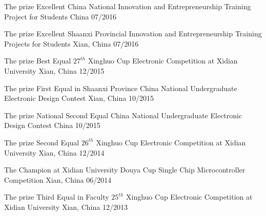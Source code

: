 


\begin{cvhonors}

  \cvhonor
    {The prize Excellent} %
    {China National Innovation and Entrepreneurship Training Project for Students} %
    {China} %
    {07/2016} %

  \cvhonor
    {The prize Excellent} %
    {Shaanxi Provincial Innovation and Entrepreneurship Training Projects for Students} %
    {Xian, China} %
    {07/2016} %

  \cvhonor
    {The prize Best Equal} %
    {$27^{th}$ Xinghuo Cup Electronic Competition at Xidian University} %
    {Xian, China} %
    {12/2015} %

  \cvhonor
	{The prize First Equal in Shaanxi Province} %
	{China National Undergraduate Electronic Design Contest} %
	{Xian, China} %
	{10/2015} %

  \cvhonor
	{The prize National Second Equal} %
	{China National Undergraduate Electronic Design Contest} %
	{China} %
	{10/2015} %

  \cvhonor
	{The prize Second Equal } %
	{$26^{th}$ Xinghuo Cup Electronic Competition at Xidian University} %
	{Xian, China} %
	{12/2014} %

  \cvhonor
	{The Champion at Xidian University} %
	{Douya Cup Single Chip Microcontroller Competition} %
	{Xian, China} %
	{06/2014} %

  \cvhonor
	{The prize Third Equal in Faculty} %
	{$25^{th}$ Xinghuo Cup Electronic Competition at Xidian University}%
	{Xian, China} %
	{12/2013} %

 
\end{cvhonors}


